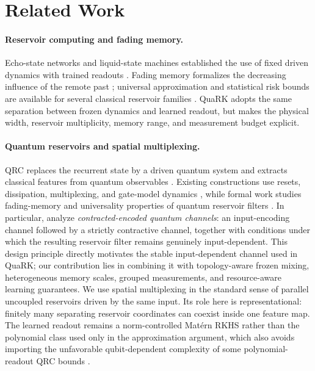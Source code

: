 \section{Related Work}
\label{sec:related-work}

\paragraph{Reservoir computing and fading memory.}
Echo-state networks and liquid-state machines established the use of fixed
driven dynamics with trained readouts
\citep{Jaeger2001,MaassNatschlagerMarkram2002}.  Fading memory formalizes the
decreasing influence of the remote past \citep{BoydChua1985}; universal
approximation and statistical risk bounds are available for several classical
reservoir families \citep{GrigoryevaOrtega2018,GononGrigoryevaOrtega2020}.
QuaRK adopts the same separation between frozen dynamics and learned readout,
but makes the physical width, reservoir multiplicity, memory range, and
measurement budget explicit.

\paragraph{Quantum reservoirs and spatial multiplexing.}
QRC replaces the recurrent state by a driven quantum system and extracts
classical features from quantum observables \citep{FujiiNakajima2017,
ChenNurdin2019,ChenNurdinYamamoto2020}.  Existing constructions use resets,
dissipation, multiplexing, and gate-model dynamics
\citep{NakajimaEtAl2019,MujalEtAl2023,MolteniDestriPrati2023,HuEtAl2024},
while formal work studies fading-memory and universality properties of quantum
reservoir filters \citep{MartinezPenaOrtega2023,MartinezPenaOrtega2025,
MonzaniPrati2025}.  In particular, \citet{MartinezPenaOrtega2025} analyze
\emph{contracted-encoded quantum channels}: an input-encoding channel followed
by a strictly contractive channel, together with conditions under which the
resulting reservoir filter remains genuinely input-dependent.  This design
principle directly motivates the stable input-dependent channel used in QuaRK;
our contribution lies in combining it with topology-aware frozen mixing,
heterogeneous memory scales, grouped measurements, and resource-aware
learning guarantees.  We use spatial multiplexing in the standard sense of
parallel uncoupled reservoirs driven by the same input.  Its role here is
representational: finitely many separating reservoir coordinates can coexist
inside one feature map.  The learned readout remains a norm-controlled Mat\'ern
RKHS rather than the polynomial class used only in the approximation argument,
which also avoids importing the unfavorable qubit-dependent complexity of
some polynomial-readout QRC bounds \citep{ChmielewskiEtAl2025}.

